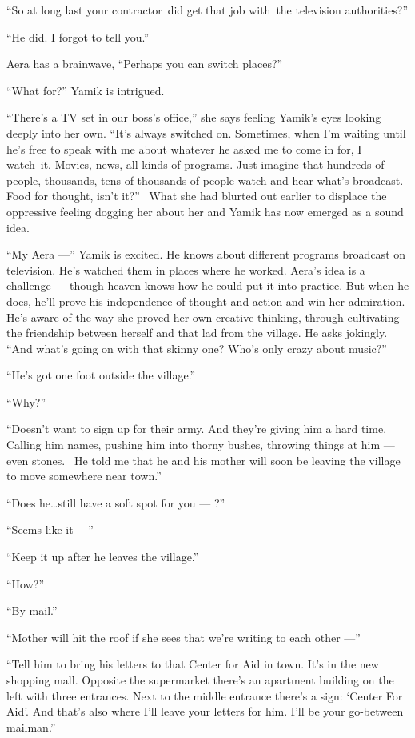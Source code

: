 \documentclass[twoside,11pt,openany]{book}
\begin{document}
``So at long last your contractor~did get that job with~the television authorities?''

``He did. I forgot to tell you.''

Aera has a brainwave, ``Perhaps you can switch places?''

``What for?'' Yamik is intrigued.

``There's a TV set in our boss's office,'' she says feeling Yamik's eyes looking deeply into
her own.  ``It's always switched on. Sometimes, when I'm waiting until he's free to speak with me about
whatever he asked me to come in for, I watch~it. Movies, news, all kinds of programs. Just imagine that hundreds of
people, thousands, tens of thousands of people watch and hear what's broadcast. Food for thought, isn't
it?''~ What she had blurted out earlier to displace the oppressive feeling dogging her about her and Yamik
has now emerged as a sound idea.

``My Aera ---'' Yamik is excited. He knows about different programs broadcast on television.
He's watched them in places where he worked. Aera's idea is a challenge --- though heaven knows how he could put it into
practice. But when he does, he'll prove his independence of thought and action and win her admiration. He's aware of
the way she proved her own creative thinking, through cultivating the friendship between herself and
that lad from the village. He asks jokingly. ``And what's going on with that skinny one? Who's only crazy
about music?''

``He's got one foot outside the village.''

``Why?''

``Doesn't want to sign up for their army. And they're giving him a hard time. Calling him names, pushing
him into thorny bushes, throwing things at him --- even stones. ~He told me that he and his mother will soon be leaving
the village to move somewhere near town.''

``Does he{\ldots}still have a soft spot for you --- ?''

``Seems like it ---''

``Keep it up after he leaves the village.''

``How?''

``By mail.''

``Mother will hit the roof if she sees that we're writing to each other ---''

``Tell him to bring his letters to that Center for Aid in town. It's in the new shopping mall.  Opposite
the supermarket there's an apartment building on the left with three entrances. Next to the middle entrance there's a
sign: `Center For Aid'. And that's also where I'll leave your letters for him. I'll be your go-between
mailman.''
\end{document}
